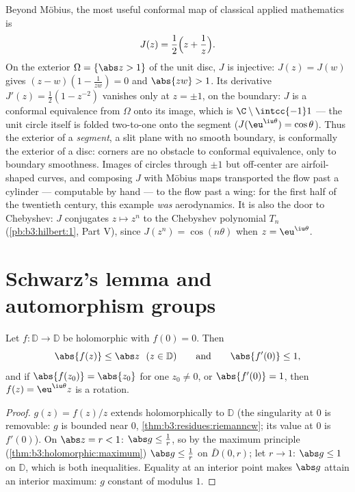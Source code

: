 \begin{example}\label{ex:b3:conformal:joukowski}
Beyond M\"obius, the most useful conformal map of classical
applied mathematics is
\[
J(z) = \frac12\Bigl(z + \frac1z\Bigr) .
\]
On the exterior $\Omega = \{\abs z > 1\}$ of the unit disc,
$J$ is injective: $J(z) = J(w)$ gives $(z - w)(1 -
\frac1{zw}) = 0$ and $\abs{zw} > 1$. Its derivative $J'(z) =
\frac12(1 - z^{-2})$ vanishes only at $z = \pm1$, on the
boundary: $J$ is a conformal equivalence from $\Omega$ onto
its image, which is $\C\setminus\intcc{-1}1$ --- the unit
circle itself is folded two-to-one onto the segment
($J(\eu^{\iu\theta}) = \cos\theta$). Thus the exterior of a
\emph{segment}, a slit plane with no smooth boundary, is
conformally the exterior of a disc: corners are no obstacle
to conformal equivalence, only to boundary smoothness. Images
of circles through $\pm1$ but off-center are airfoil-shaped
curves, and composing $J$ with M\"obius maps transported the
flow past a cylinder --- computable by hand --- to the flow
past a wing: for the first half of the twentieth century,
this example \emph{was} aerodynamics. It is also the door to
Chebyshev: $J$ conjugates $z \mapsto z^n$ to the Chebyshev
polynomial $T_n$ (\cref{pb:b3:hilbert:1}, Part V), since
$J(z^n) = \cos(n\theta)$ when $z = \eu^{\iu\theta}$.
\end{example}

\section{Schwarz's lemma and automorphism groups}

\begin{theorem}\label{thm:b3:conformal:schwarz}
Let $f \colon \mathbb D \to \mathbb D$ be holomorphic with
$f(0) = 0$. Then
\[
\abs{f(z)} \leq \abs z \ \ (z \in \mathbb D)
\qquad\text{and}\qquad \abs{f'(0)} \leq 1 ,
\]
and if $\abs{f(z_0)} = \abs{z_0}$ for one $z_0 \neq 0$, or
$\abs{f'(0)} = 1$, then $f(z) = \eu^{\iu\theta}z$ is a
rotation.
\end{theorem}

\begin{proof}
$g(z) = f(z)/z$ extends holomorphically to $\mathbb D$ (the
singularity at $0$ is removable: $g$ is bounded near $0$,
\cref{thm:b3:residues:riemanncw}; its value at $0$ is
$f'(0)$). On $\abs z = r < 1$: $\abs g \leq \frac1r$, so by
the maximum principle (\cref{thm:b3:holomorphic:maximum})
$\abs g \leq \frac1r$ on $\bar D(0,r)$; let $r \to 1$: $\abs
g \leq 1$ on $\mathbb D$, which is both inequalities. Equality
at an interior point makes $\abs g$ attain an interior
maximum: $g$ constant of modulus $1$.
\end{proof}

